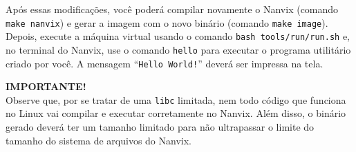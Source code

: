 \documentclass[11pt]{article}
\newcommand*{\alert}[1]{\vspace{0.4cm}\colorbox{gray!60!white}{\parbox{0.92\linewidth}{{\centering \textbf{IMPORTANTE!}\\}#1}}\vspace{0.4cm}}
\begin{document}
Após essas modificações, você poderá compilar novamente o Nanvix (comando \texttt{make nanvix}) e gerar a imagem com o novo binário (comando \texttt{make image}). Depois, execute a máquina virtual usando o comando \texttt{bash tools/run/run.sh} e, no terminal do Nanvix, use o comando \texttt{hello} para executar o programa utilitário criado por você. A mensagem ``\texttt{Hello World!}'' deverá ser impressa na tela.

\alert{Observe que, por se tratar de uma \texttt{libc} limitada, nem todo código que funciona no Linux vai compilar e executar corretamente no Nanvix. Além disso, o binário gerado deverá ter um tamanho limitado para não ultrapassar o limite do tamanho do sistema de arquivos do Nanvix.}
\end{document}
